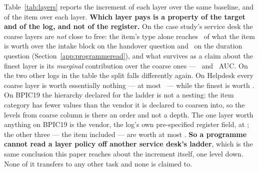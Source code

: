 Table~\ref{tab:layers} reports the increment of each layer over the same
baseline, and of the item over each layer. \textbf{Which layer pays is a
property of the target and of the log, and not of the register.} On the case
study's service desk the coarse layers are \emph{not} close to free: the item's type
alone reaches \layerTypeSharePctHandover\ of what the item is worth over the
intake block on the handover question and
\layerTypeSharePctDuration\ on the duration question
(Section~\ref{app:programmeread}), and what survives as a claim about the finest
layer is its \emph{marginal} contribution over the coarse ones ---
\layerItemMarginalHandover\ and \layerItemMarginalDuration\ AUC. On the two
other logs in the table the split falls differently again. On Helpdesk every
coarse layer is worth essentially nothing --- at most
\layerHelpdeskCoarseMax\ --- while the finest is worth \layerHelpdeskItem. On
BPIC19 the hierarchy declared for the ladder is not a nesting: the item
category has fewer values than the vendor it is declared to coarsen into, so
the \textsf{levels from coarse} column is there an order and not a depth. The one layer worth anything
on BPIC19 is the vendor, the log's own pre-specified register field, at
\layerBpicNineteenVendor; the other three --- the item included --- are worth
at most \layerBpicNineteenOthersMax. \textbf{So a programme cannot
read a layer policy off another service desk's ladder}, which is the same conclusion
this paper reaches about the increment itself, one level down. None of it
transfers to any other task and none is claimed to.
